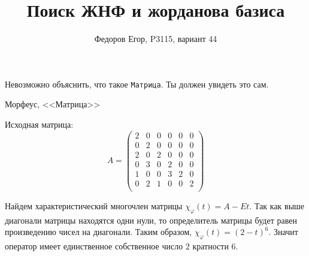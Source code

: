 \documentclass{article}
\title{Поиск ЖНФ и жорданова базиса}
\author{Федоров Егор, P3115, вариант 44}
\date{}
\begin{document}
  \maketitle
  \epigraph{
    Невозможно объяснить, что такое \texttt{Матрица}. Ты должен увидеть это сам.
  }{Морфеус, <<Матрица>>}

  Исходная матрица:
  \[
  A = 
    \begin{pmatrix}
  2 & 0 & 0 & 0 & 0 & 0 \\
  0 & 2 & 0 & 0 & 0 & 0 \\
  2 & 0 & 2 & 0 & 0 & 0 \\
  0 & 3 & 0 & 2 & 0 & 0 \\
  1 & 0 & 0 & 3 & 2 & 0 \\
  0 & 2 & 1 & 0 & 0 & 2 \\
      \end{pmatrix}
  \]

  Найдем характеристический многочлен матрицы $\chi_\varphi(t) = A - E t$.
  Так как выше диагонали матрицы находятся одни нули, то определитель матрицы будет
  равен произведению чисел на диагонали. Таким образом, $\chi_\varphi(t) = (2-t)^6$.
  Значит оператор имеет единственное собственное число $2$ кратности $6$.
\end{document}
